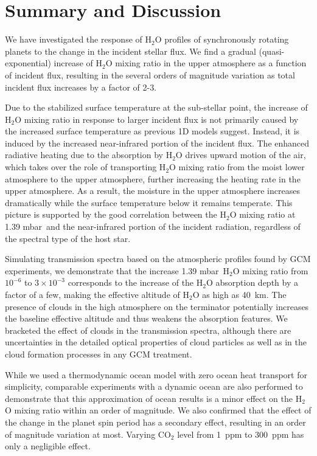 \documentclass[11pt,numberedappendix,twocolappendix,]{emulateapj}
\def\water{H$_2$O }
\def\preslevel{1.39 mbar\ }
\begin{document}
\section{Summary and Discussion}
\label{s:summary}

We have investigated the response of \water profiles of synchronously rotating planets to the change in the incident stellar flux. 
We find a gradual (quasi-exponential) increase of \water mixing ratio in the upper atmosphere as a function of incident flux, resulting in the several orders of magnitude variation as total incident flux increases by a factor of 2-3. 

Due to the stabilized surface temperature at the sub-stellar point, the increase of \water mixing ratio in response to larger incident flux is not primarily caused by the increased surface temperature as previous 1D models suggest. 
Instead, it is induced by the increased near-infrared portion of the incident flux. 
The enhanced radiative heating due to the absorption by \water drives upward motion of the air, which takes over the role of transporting \water mixing ratio from the moist lower atmosphere to the upper atmosphere, further increasing the heating rate in the upper atmosphere.
As a result, the moisture in the upper atmosphere increases dramatically while the surface temperature below it remains temperate. 
This picture is supported by the good correlation between the \water mixing ratio at \preslevel and the near-infrared portion of the incident radiation, regardless of the spectral type of the host star. 

Simulating transmission spectra based on the atmospheric profiles found by GCM experiments, 
we demonstrate that the increase \preslevel \water mixing ratio from $10^{-6}$ to $3 \times 10^{-3}$ corresponds to the increase of the \water absorption depth by a factor of a few, making the effective altitude of \water as high as 40~km. 
The presence of clouds in the high atmosphere on the terminator potentially increases the baseline effective altitude and thus weakens the absorption features. 
We bracketed the effect of clouds in the transmission spectra, 
although there are uncertainties in the detailed optical properties of cloud particles as well as in the cloud formation processes in any GCM treatment. 

While we used a thermodynamic ocean model with zero ocean heat transport for simplicity, comparable experiments with a dynamic ocean are also performed to demonstrate that this approximation of ocean results is a minor effect on the \water mixing ratio within an order of magnitude. 
We also confirmed that the effect of the change in the planet spin period has a secondary effect, resulting in an order of magnitude variation at most. 
Varying CO$_2$ level from 1~ppm to 300~ppm has only a negligible effect. 
\end{document}
